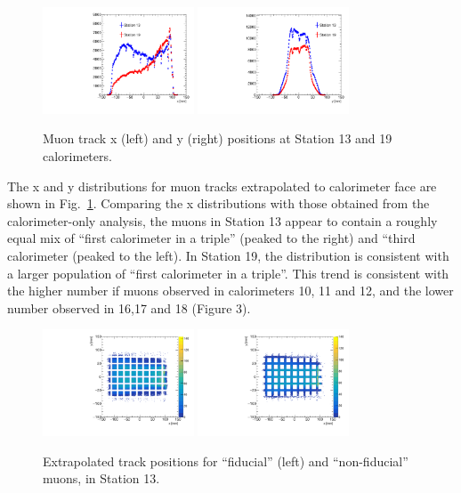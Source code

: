 \documentclass[a4paper, 11pt]{article}
\begin{document}
\begin{figure}[h]
\centering
\includegraphics[width=0.4\textwidth]{figures/St13_mu_x.pdf}
\includegraphics[width=0.4\textwidth]{figures/St13_mu_y.pdf}
\caption{Muon track x (left) and y (right) positions at Station 13 and 19 calorimeters. \label{fig:muon_posn}}
\end{figure}

The x and y distributions for muon tracks extrapolated to calorimeter face are shown in Fig.~\ref{fig:muon_posn}. Comparing the x distributions with those obtained from the calorimeter-only analysis, the muons in Station 13 appear to contain a roughly equal mix of ``first calorimeter in a triple'' (peaked to the right) and ``third calorimeter (peaked to the left). In Station 19, the distribution is consistent with a larger population of ``first calorimeter in a triple''. This trend is consistent with the higher number if muons observed in calorimeters 10, 11 and 12, and the lower number observed in 16,17 and 18 (Figure 3).

\begin{figure}[h]
\centering
\includegraphics[width=0.4\textwidth]{figures/St13_mu_xy_fid.pdf}
\includegraphics[width=0.4\textwidth]{figures/St13_mu_xy_nfid.pdf}
\caption{Extrapolated track positions for ``fiducial'' (left) and ``non-fiducial'' muons, in Station 13.\label{fig:fiducial}}
\end{figure}
\end{document}
